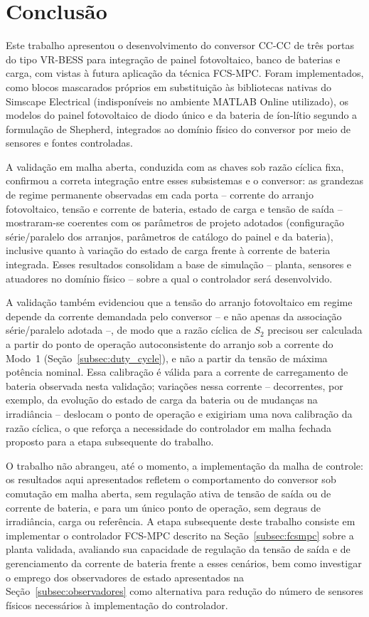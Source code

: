 \section{Conclusão}
\label{sec:conclusao}

Este trabalho apresentou o desenvolvimento do conversor CC-CC de três
portas do tipo VR-BESS para integração de painel fotovoltaico, banco de
baterias e carga, com vistas à futura aplicação da técnica FCS-MPC. Foram
implementados, como blocos mascarados próprios em substituição às
bibliotecas nativas do Simscape Electrical (indisponíveis no ambiente
MATLAB Online utilizado), os modelos do painel fotovoltaico de diodo único
e da bateria de íon-lítio segundo a formulação de Shepherd, integrados ao
domínio físico do conversor por meio de sensores e fontes controladas.

A validação em malha aberta, conduzida com as chaves sob razão cíclica
fixa, confirmou a correta integração entre esses subsistemas e o
conversor: as grandezas de regime permanente observadas em cada porta --
corrente do arranjo fotovoltaico, tensão e corrente de bateria, estado de
carga e tensão de saída -- mostraram-se coerentes com os parâmetros de
projeto adotados (configuração série/paralelo dos arranjos, parâmetros de
catálogo do painel e da bateria), inclusive quanto à variação do estado de
carga frente à corrente de bateria integrada. Esses resultados consolidam
a base de simulação -- planta, sensores e atuadores no domínio físico --
sobre a qual o controlador será desenvolvido.

A validação também evidenciou que a tensão do arranjo fotovoltaico em
regime depende da corrente demandada pelo conversor -- e não apenas da
associação série/paralelo adotada --, de modo que a razão cíclica de
$S_2$ precisou ser calculada a partir do ponto de operação
autoconsistente do arranjo sob a corrente do Modo~1
(Seção~\ref{subsec:duty_cycle}), e não a partir da tensão de máxima
potência nominal. Essa calibração é válida para a corrente de
carregamento de bateria observada nesta validação; variações nessa
corrente -- decorrentes, por exemplo, da evolução do estado de carga da
bateria ou de mudanças na irradiância -- deslocam o ponto de operação e
exigiriam uma nova calibração da razão cíclica, o que reforça a
necessidade do controlador em malha fechada proposto para a etapa
subsequente do trabalho.

O trabalho não abrangeu, até o momento, a implementação da malha de
controle: os resultados aqui apresentados refletem o comportamento do
conversor sob comutação em malha aberta, sem regulação ativa de tensão de
saída ou de corrente de bateria, e para um único ponto de operação, sem
degraus de irradiância, carga ou referência. A etapa subsequente deste
trabalho consiste em implementar o controlador FCS-MPC descrito na
Seção~\ref{subsec:fcsmpc} sobre a planta validada, avaliando sua capacidade
de regulação da tensão de saída e de gerenciamento da corrente de bateria
frente a esses cenários, bem como investigar o emprego dos observadores de
estado apresentados na Seção~\ref{subsec:observadores} como alternativa
para redução do número de sensores físicos necessários à implementação do
controlador.

